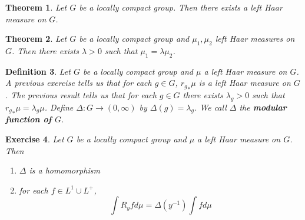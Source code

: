 \documentclass[12pt]{amsart}
\newtheorem{thm}{Theorem}[subsection]
\newtheorem{defn}[thm]{Definition}
\newtheorem{ex}[thm]{Exercise}
\newcommand{\Del}{\Delta}
\newcommand{\lam}{\lambda}
\begin{document}
	\begin{thm}
		Let $G$ be a locally compact group. Then there exists a left Haar measure on $G$. 
	\end{thm}
	
	\begin{thm}
		Let $G$ be a locally compact group and $\mu_1, \mu_2$ left Haar measures on $G$. Then there exists $\lam > 0$ such that $\mu_1 = \lam \mu_2 $.
	\end{thm}
	
	\begin{defn}
		Let $G$ be a locally compact group and $\mu$ a left Haar measure on $G$. A previous exercise tells us that for each $g \in G$, ${r_g}_*\mu$ is a left Haar measure on $G$. The previous result tells us that for each $g \in G$ there exists $\lam_g >0$ such that ${r_g}_*\mu = \lam_g \mu$. Define $\Del: G \rightarrow (0, \infty)$ by $\Del(g) = \lam_g$. We call $\Del$ the \textbf{modular function of $G$}. 
	\end{defn}

	\begin{ex}
		Let $G$ be a locally compact group and $\mu$ a left Haar measure on $G$. Then 
		\begin{enumerate}
			\item $\Del $ is a homomorphism 
			\item for each $f \in L^1 \cup L^+$, $$\int R_y f d \mu = \Del(y^{-1}) \int f d \mu$$
		\end{enumerate}
	\end{ex}
\end{document}
